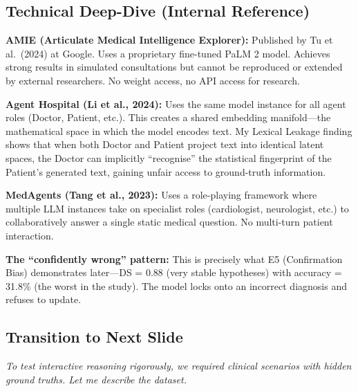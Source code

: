 \documentclass[12pt]{article}
\begin{document}
  \subsection*{Technical Deep-Dive (Internal Reference)}
  {\color{techgray}
  \textbf{AMIE (Articulate Medical Intelligence Explorer):} Published by Tu et al.\ (2024) at Google. Uses a proprietary fine-tuned PaLM 2 model. Achieves strong results in simulated consultations but cannot be reproduced or extended by external researchers. No weight access, no API access for research.

  \textbf{Agent Hospital (Li et al., 2024):} Uses the same model instance for all agent roles (Doctor, Patient, etc.). This creates a shared embedding manifold---the mathematical space in which the model encodes text. My Lexical Leakage finding shows that when both Doctor and Patient project text into identical latent spaces, the Doctor can implicitly ``recognise'' the statistical fingerprint of the Patient's generated text, gaining unfair access to ground-truth information.

  \textbf{MedAgents (Tang et al., 2023):} Uses a role-playing framework where multiple LLM instances take on specialist roles (cardiologist, neurologist, etc.) to collaboratively answer a single static medical question. No multi-turn patient interaction.

  \textbf{The ``confidently wrong'' pattern:} This is precisely what E5 (Confirmation Bias) demonstrates later---DS = 0.88 (very stable hypotheses) with accuracy = 31.8\% (the worst in the study). The model locks onto an incorrect diagnosis and refuses to update.
  }

  \subsection*{Transition to Next Slide}
  {\color{transgreen}
  \textit{To test interactive reasoning rigorously, we required clinical scenarios with hidden ground truths. Let me describe the dataset.}
  }
\end{document}
